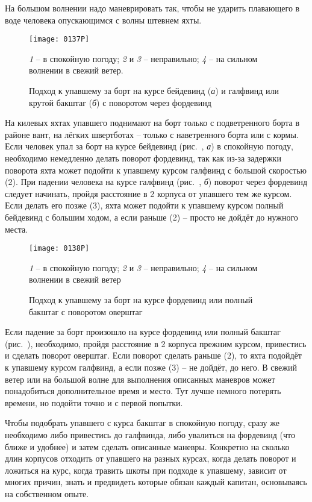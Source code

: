 На большом волнении надо маневрировать так, чтобы не ударить
плавающего в воде человека опускающимся с волны штевнем яхты.

\begin{figure*}[h]
  \centering{}
  \texttt{[image: 0137P]}
  \caption{Подход к упавшему за борт на курсе бейдевинд (\textit{а}) и галфвинд или крутой бакштаг (\textit{б}) с поворотом через фордевинд}
  \label{fig:137}
  \small
  \centering{}
  \textit{1} \--- в спокойную погоду; \textit{2} и \textit{3} \--- неправильно; \textit{4} \--- на сильном волнении в свежий ветер.
\end{figure*}

На килевых яхтах упавшего поднимают на борт только с подветренного
борта в районе вант, на лёгких швертботах \--- только с наветренного
борта или с кормы. Если человек упал за борт на курсе бейдевинд
(рис.~, \textit{а}) в спокойную погоду, необходимо немедленно
делать поворот фордевинд, так как из-за задержки поворота яхта может
подойти к упавшему курсом галфвинд с большой скоростью (2). При
падении человека на курсе галфвинд (рис.~, \textit{б})
поворот через фордевинд следует начинать, пройдя расстояние в 2
корпуса от упавшего тем же курсом. Если делать его позже (3), яхта
может подойти к упавшему курсом полный бейдевинд с большим ходом, а
если раньше (2) \--- просто не дойдёт до нужного места.

\begin{figure}[h]
  \centering{}
  \texttt{[image: 0138P]}
  \caption{Подход к упавшему за борт на курсе фордевинд или полный бакштаг с поворотом оверштаг}
  \label{fig:138}
  \small
  \centering{}
  \textit{1} \--- в спокойную погоду; \textit{2} и \textit{3} \--- неправильно; \textit{4} \--- на сильном волнении в свежий ветер
\end{figure}

Если падение за борт произошло на курсе фордевинд или полный бакштаг
(рис.~), необходимо, пройдя расстояние в 2 корпуса
прежним курсом, привестись и сделать поворот оверштаг. Если поворот
сделать раньше (2), то яхта подойдёт к упавшему курсом галфвинд, а
если позже (3) \--- не дойдёт, до него. В свежий ветер или на большой
волне для выполнения описанных маневров может понадобиться
дополнительное время и место. Тут лучше немного потерять времени, но
подойти точно и с первой попытки.

Чтобы подобрать упавшего с курса бакштаг в спокойную погоду, сразу же
необходимо либо привестись до галфвинда, либо увалиться на фордевинд
(что ближе и удобнее) и затем сделать описанные маневры. Конкретно на
сколько длин корпусов отходить от упавшего на разных курсах, когда
делать поворот и ложиться на курс, когда травить шкоты при подходе к
упавшему, зависит от многих причин, знать и предвидеть которые обязан
каждый капитан, основываясь на собственном опыте.

